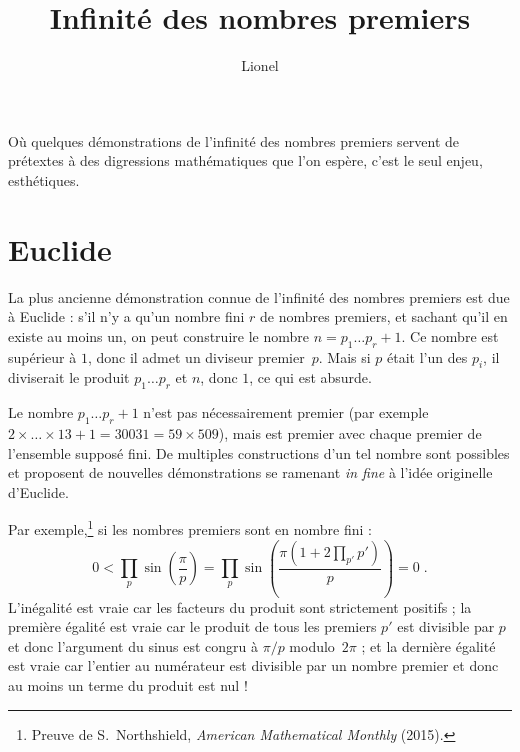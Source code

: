\documentclass[a4paper,11pt]{article}
\title{Infinité des nombres premiers}
\author{Lionel \bsc{V\kern-1pt idal}}
\renewenvironment{abstract}%
  {\quotation\noindent\ignorespaces}%
  {\endquotation}
\begin{document}
\maketitle
\begin{abstract}
  Où quelques démonstrations de l'infinité des nombres premiers servent
  de prétextes à des digressions mathématiques que l'on espère, c'est le
  seul enjeu, esthétiques.
\end{abstract}

\section{Euclide}

La plus ancienne démonstration connue de l'infinité des nombres premiers
est due à Euclide : s'il n'y a qu'un nombre fini $r$ de nombres premiers,
et sachant qu'il en existe au moins un, on peut construire le nombre
$n=p_1\ldots p_r+1$. Ce nombre est supérieur à $1$, donc il admet un
diviseur premier~$p$. Mais si $p$ était l'un des $p_i$, il diviserait le
produit $p_1\ldots p_r$ et $n$, donc $1$, ce qui est absurde.

Le nombre $p_1\ldots p_r+1$ n'est pas nécessairement premier (par exemple
$2\times\ldots\times 13+1=30031=59\times509$), mais est premier avec chaque
premier de l'ensemble supposé fini. De multiples constructions d'un tel
nombre sont possibles et proposent de nouvelles démonstrations se ramenant
\emph{in fine} à l'idée originelle d'Euclide.

\medskip
Par exemple,\footnote{%
  Preuve de S.~Northshield, {\slshape American Mathematical Monthly\/} (2015).}
si les nombres premiers sont en nombre fini :
\[
  0 < \prod_p \sin \left(\frac{\pi}{p}\right)
  = \prod_p \sin\left(\frac{\pi(1+2\prod_{p'}p')}{p}\right) = 0\;.
\]
L'inégalité est vraie car les facteurs du produit sont strictement
positifs ; la première égalité est vraie car le produit de tous les premiers
$p'$ est divisible par $p$ et donc l'argument du sinus est congru à $\pi/p$
modulo~$2\pi$ ; et la dernière égalité est vraie car l'entier au numérateur
est divisible par un nombre premier et donc au moins un terme du produit est
nul !
\end{document}
